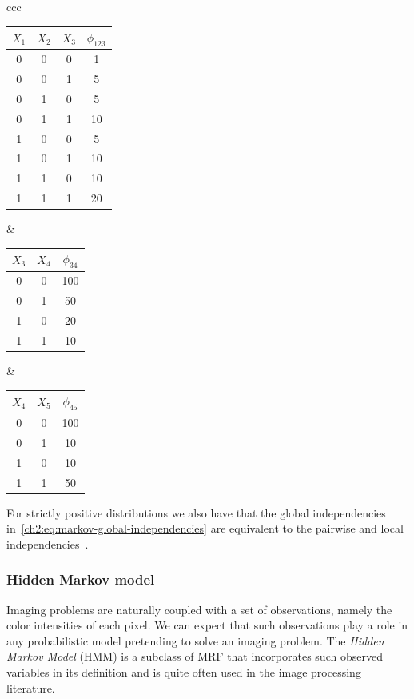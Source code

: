 \begin{center}
\begin{tabular}{ccc}
\begin{tabular}{|c|c|c|c|}
\hline
$X_1$ & $X_2$ & $X_3$ & $\phi_{123}$\\
\hline
0 & 0 & 0 & 1\\
0 & 0 & 1 & 5\\
0 & 1 & 0 & 5\\
0 & 1 & 1 & 10\\
1 & 0 & 0 & 5\\
1 & 0 & 1 & 10\\
1 & 1 & 0 & 10\\
1 & 1 & 1 & 20\\
\hline
\end{tabular}&
\begin{tabular}{|c|c|c|}
\hline
$X_3$ & $X_4$ & $\phi_{34}$\\
\hline
0 & 0 & 100\\
0 & 1 & 50\\
1 & 0 & 20\\
1 & 1 & 10\\
\hline
\end{tabular}&
\begin{tabular}{|c|c|c|}
\hline
$X_4$ & $X_5$ & $\phi_{45}$\\
\hline
0 & 0 & 100\\
0 & 1 & 10\\
1 & 0 & 10\\
1 & 1 & 50\\
\hline
\end{tabular}
\end{tabular}
\end{center}

For strictly positive distributions we also have that the global independencies in~\cref{ch2:eq:markov-global-independencies} are equivalent to the pairwise and local independencies~\cite{koller09}.

\subsubsection{Hidden Markov model}

Imaging problems are naturally coupled with a set of observations, namely the color intensities of each pixel. We can expect that such observations play a role in any probabilistic model pretending to solve an imaging problem. The \emph{Hidden Markov Model} (HMM) is a subclass of MRF that incorporates such observed variables in its definition and is quite often used in the image processing literature.

